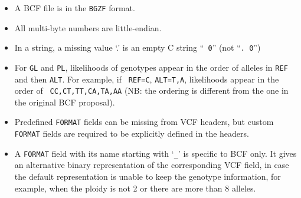 \documentclass[10pt,pdftex]{article}
\begin{document}
\begin{itemize}
\item A BCF file is in the {\tt BGZF} format.
\item All multi-byte numbers are little-endian.
\item In a string, a missing value `.' is an empty C string ``{\tt
     0}'' (not ``{\tt . 0}'')
\item For {\tt GL} and {\tt PL}, likelihoods of genotypes appear in the
  order of alleles in {\tt REF} and then {\tt ALT}. For example, if {\tt
    REF=C}, {\tt ALT=T,A}, likelihoods appear in the order of {\tt
    CC,CT,TT,CA,TA,AA} (NB: the ordering is different from the one in the original
	BCF proposal).
\item Predefined {\tt FORMAT} fields can be missing from VCF headers, but custom {\tt FORMAT} fields
	are required to be explicitly defined in the headers.
\item A {\tt FORMAT} field with its name starting with `{\tt \_}' is specific to BCF only.
	It gives an alternative binary representation of the corresponding VCF field, in case
	the default representation is unable to keep the genotype information,
	for example, when the ploidy is not 2 or there are more than 8 alleles.
\end{itemize}
\end{document}
